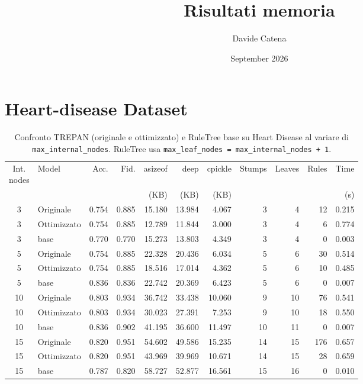 \documentclass{article}
\title{Risultati memoria}
\author{Davide Catena}
\date{September 2026}
\begin{document}
\maketitle

\section{Heart-disease Dataset}

\begin{table}[htbp]
\raggedright
\caption{Confronto TREPAN (originale e ottimizzato) e RuleTree base su Heart Disease al variare di \texttt{max\_internal\_nodes}. RuleTree usa \texttt{max\_leaf\_nodes = max\_internal\_nodes + 1}.}
\label{tab:risultati}
\footnotesize
\setlength{\tabcolsep}{3pt}
\begin{tabular}{c l r r r r r r r r r}
\toprule
\makecell{Int.\\nodes} & Model & Acc. & Fid. & asizeof & deep & cpickle & Stumps & Leaves & Rules & Time \\
 & & & & (KB) & (KB) & (KB) & & & & (s)  \\
\midrule
3 & Originale   & 0.754 & 0.885 & 15.180 & 13.984 & 4.067 & 3 & 4 & 12 & 0.215 \\
3 & Ottimizzato & 0.754 & 0.885 & 12.789 & 11.844 & 3.000 & 3 & 4 & 6 & 0.774 \\
3 & base        & 0.770 & 0.770 & 15.273 & 13.803 & 4.349 & 3 & 4 & 0 & 0.003 \\
\midrule
5 & Originale   & 0.754 & 0.885 & 22.328 & 20.436 & 6.034 & 5 & 6 & 30 & 0.514 \\
5 & Ottimizzato & 0.754 & 0.885 & 18.516 & 17.014 & 4.362 & 5 & 6 & 10 & 0.485 \\
5 & base        & 0.836 & 0.836 & 22.742 & 20.369 & 6.423 & 5 & 6 & 0 & 0.007 \\
\midrule
10 & Originale   & 0.803 & 0.934 & 36.742 & 33.438 & 10.060 & 9 & 10 & 76 & 0.541 \\
10 & Ottimizzato & 0.803 & 0.934 & 30.023 & 27.391 & 7.253 & 9 & 10 & 18 & 0.550 \\
10 & base        & 0.836 & 0.902 & 41.195 & 36.600 & 11.497 & 10 & 11 & 0 & 0.007 \\
\midrule
15 & Originale   & 0.820 & 0.951 & 54.602 & 49.586 & 15.235 & 14 & 15 & 176 & 0.657 \\
15 & Ottimizzato & 0.820 & 0.951 & 43.969 & 39.969 & 10.671 & 14 & 15 & 28 & 0.659 \\
15 & base        & 0.787 & 0.820 & 58.727 & 52.877 & 16.561 & 15 & 16 & 0 & 0.010 \\

\end{tabular}
\end{table}
\end{document}
